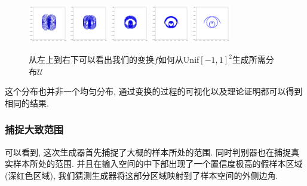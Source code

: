 \documentclass[lang=cn,11pt]{elegantpaper}
\begin{document}
\begin{figure}[htpb]
  \includegraphics[width=0.15\textwidth]{wings_1_8}
  \includegraphics[width=0.15\textwidth]{wings_1_9}
  \includegraphics[width=0.15\textwidth]{wings_1_10}
  \includegraphics[width=0.15\textwidth]{wings_1_11}
  \includegraphics[width=0.15\textwidth]{wings_1_12}

  
  \caption{从左上到右下可以看出我们的变换$f$如何从Unif$[-1,1]^2$生成所需分布$\mathcal U$}
\end{figure}

这个分布也并非一个均匀分布, 通过变换的过程的可视化以及理论证明都可以得到相同的结果.

\subsubsection{捕捉大致范围}
可以看到, 这次生成器首先捕捉了大概的样本所处的范围. 同时判别器也在捕捉真实样本所处的范围. 并且在输入空间的中下部出现了一个置信度极高的假样本区域(深红色区域), 我们猜测生成器将这部分区域映射到了样本空间的外侧边角. 
\end{document}
